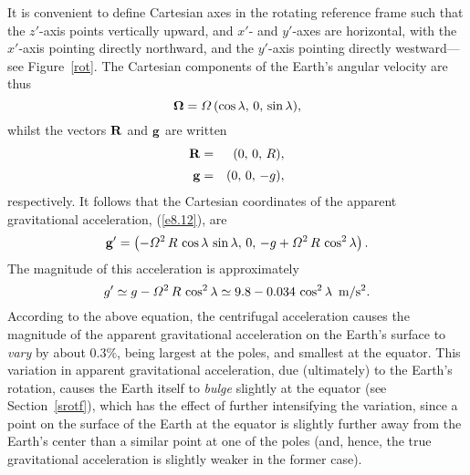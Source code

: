 It is convenient to define Cartesian axes in the rotating reference frame such that the $z'$-axis
points vertically upward, and $x'$- and $y'$-axes are horizontal, with
the $x'$-axis pointing directly northward, and the $y'$-axis pointing directly westward---see Figure~\ref{rot}.
The Cartesian components of the Earth's angular velocity are thus
\begin{equation}
\bOmega = {\mit\Omega}\,(\cos\lambda,\,0,\,\sin\lambda),
\end{equation}
whilst the vectors ${\bf R}$ and ${\bf g}$ are written
\begin{eqnarray}
{\bf R} &=& (0,\,0,\,R),\\[0.5ex]
{\bf g} &=& (0,\,0,\,-g),
\end{eqnarray}
respectively.
 It follows that the Cartesian coordinates
of the apparent gravitational acceleration, (\ref{e8.12}), are
\begin{equation}\label{e8.13}
{\bf g}' = \left(-{\mit\Omega}^2\,R\,\cos\lambda\,\sin\lambda,\,0,\,
-g + {\mit\Omega}^2\,R\,\cos^2\lambda\right).
\end{equation}
The magnitude of this acceleration is approximately
\begin{equation}
g' \simeq g - {\mit\Omega}^2\,R\,\cos^2\lambda \simeq 9.8 - 0.034\,\cos^2\lambda\,\,\, {\rm m/s^2}.
\end{equation}
According to the above equation, the centrifugal acceleration causes the magnitude of the apparent gravitational
acceleration on the Earth's surface to {\em vary}\/ by about $0.3\%$, being largest
at the poles, and smallest at the equator. This variation in apparent
gravitational acceleration, due (ultimately) to the Earth's rotation, causes the
Earth itself to {\em bulge}\/ slightly at the equator (see Section~\ref{srotf}), which has the effect of further intensifying the variation, since a point on the surface of the Earth at the
equator is slightly further away  from the Earth's center than a similar point at one of the
poles (and, hence, the true gravitational acceleration is slightly weaker in the
former case).

